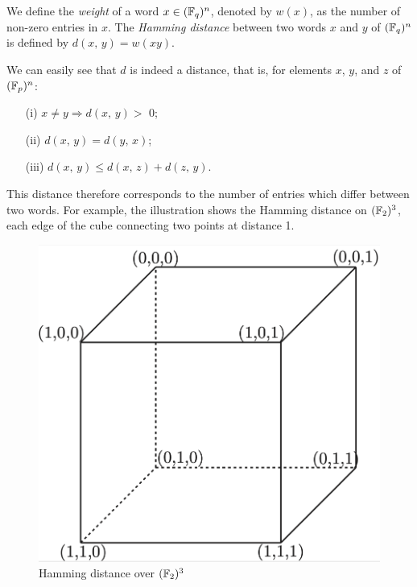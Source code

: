 \begin{defn}
\label{defn-dist-hamming}
  \label{notation-66} \label{notation-67} We define the \textit{weight} of a word $ x \in (\mathbb{F}_q )^n $, denoted by $ w (x) $, as the number of non-zero entries in $ x $. The \textit{Hamming distance} between two words $ x $ and $ y $ of $ (\mathbb{F}_q)^n $ is defined by $ d (x, \, y) = w (xy) $.
\end{defn}
We can easily see that $ d $ is indeed a distance, that is, for elements $ x $, $ y $, and $ z $ of $ (\mathbb{F}_p)^n $: \begin{itemize}
\item [{\upshape (i)}] $ x \neq y \Longrightarrow d (x, \, y)> $ 0;
\item [{\upshape (ii)}] $ d (x, \, y) = d (y, \, x) $;
\item [{\upshape (iii)}] $ d (x, \, y) \leq d (x, \, z) + d (z, \, y) $.
\end{itemize} This distance therefore corresponds to the number of entries which differ between two words. For example, the illustration  shows the Hamming distance on $ (\mathbb{F}_2)^3 $, each edge of the cube connecting two points at distance 1.
 
\begin{figure}[ht]
    \begin{center}
    \includegraphics[scale=0.6]{images/visual-dist-hamming.png}
    \end{center}
    \caption{Hamming distance over $ (\mathbb{F}_2)^3 $}
              \label{fig-visual-dist-hamming}
\end{figure}
 
